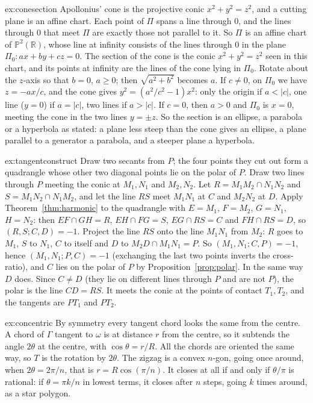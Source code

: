 \begin{solution}{ex:conesection}
\idea Apollonius' cone is the projective conic $x^2+y^2=z^2$, and a cutting plane is an affine chart.
\writeup Each point of $\Pi$ spans a line through $0$, and the lines through $0$ that meet $\Pi$ are exactly those not parallel to it. So $\Pi$ is an
affine chart of $\mathbb P^2(\mathbb R)$, whose line at infinity consists of the lines through $0$ in the plane $\Pi_0:ax+by+cz=0$. The section of the
cone is the conic $x^2+y^2=z^2$ seen in this chart, and its points at infinity are the lines of the cone lying in $\Pi_0$. Rotate about the $z$-axis so
that $b=0$, $a\ge0$; then $\sqrt{a^2+b^2}$ becomes $a$. If $c\ne0$, on $\Pi_0$ we have $z=-ax/c$, and the cone gives $y^2=(a^2/c^2-1)x^2$: only the
origin if $a<|c|$, one line ($y=0$) if $a=|c|$, two lines if $a>|c|$. If $c=0$, then $a>0$ and $\Pi_0$ is $x=0$, meeting the cone in the two lines $y=\pm z$.
So the section is an ellipse, a parabola or a hyperbola as stated: a plane less steep than the cone gives an ellipse, a plane parallel to a generator
a parabola, and a steeper plane a hyperbola.
\end{solution}

\begin{solution}{ex:tangentconstruct}
\idea Draw two secants from $P$; the four points they cut out form a quadrangle whose other two diagonal points lie on the polar of $P$.
\writeup Draw two lines through $P$ meeting the conic at $M_1,N_1$ and $M_2,N_2$. Let $R=M_1M_2\cap N_1N_2$ and $S=M_1N_2\cap N_1M_2$, and let the line $RS$ meet
$M_1N_1$ at $C$ and $M_2N_2$ at $D$. Apply Theorem~\ref{thm:harmonic} to the quadrangle with $E=M_1$, $F=M_2$, $G=N_1$, $H=N_2$: then $EF\cap GH=R$,
$EH\cap FG=S$, $EG\cap RS=C$ and $FH\cap RS=D$, so $(R,S;C,D)=-1$. Project the line $RS$ onto the line $M_1N_1$ from $M_2$: $R$ goes to $M_1$, $S$ to $N_1$,
$C$ to itself and $D$ to $M_2D\cap M_1N_1=P$. So $(M_1,N_1;C,P)=-1$, hence $(M_1,N_1;P,C)=-1$ (exchanging the last two points inverts the cross-ratio), and
$C$ lies on the polar of $P$ by Proposition~\ref{prop:polar}. In the same way $D$ does. Since $C\ne D$ (they lie on different lines through $P$ and are
not $P$), the polar is the line $CD=RS$. It meets the conic at the points of contact $T_1,T_2$, and the tangents are $PT_1$ and $PT_2$.
\end{solution}

\begin{solution}{ex:concentric}
\idea By symmetry every tangent chord looks the same from the centre.
\writeup A chord of $\Gamma$ tangent to $\omega$ is at distance $r$ from the centre, so it subtends the angle $2\theta$ at the centre, with $\cos\theta=r/R$.
All the chords are oriented the same way, so $T$ is the rotation by $2\theta$. The zigzag is a convex $n$-gon, going once around, when $2\theta=2\pi/n$,
that is $r=R\cos(\pi/n)$. It closes at all if and only if $\theta/\pi$ is rational: if $\theta=\pi k/n$ in lowest terms, it closes after $n$ steps,
going $k$ times around, as a star polygon.
\end{solution}

